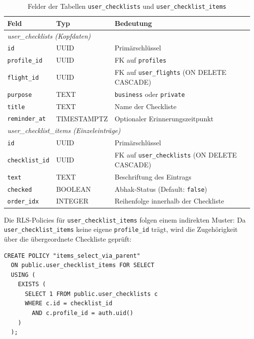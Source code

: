 \begin{table}[H]
  \centering
  \caption{Felder der Tabellen \texttt{user\_checklists} und
           \texttt{user\_checklist\_items}}
  \label{tab:checklists_felder}
  \begin{tabularx}{\textwidth}{l l X}
    \toprule
    \textbf{Feld} & \textbf{Typ} & \textbf{Bedeutung} \\
    \midrule
    \multicolumn{3}{l}{\textit{user\_checklists (Kopfdaten)}} \\
    \midrule
    \texttt{id}          & UUID        & Primärschlüssel \\
    \texttt{profile\_id} & UUID        & FK auf \texttt{profiles} \\
    \texttt{flight\_id}  & UUID        & FK auf \texttt{user\_flights} (ON DELETE CASCADE) \\
    \texttt{purpose}     & TEXT        & \texttt{business} oder \texttt{private} \\
    \texttt{title}       & TEXT        & Name der Checkliste \\
    \texttt{reminder\_at}& TIMESTAMPTZ & Optionaler Erinnerungszeitpunkt \\
    \midrule
    \multicolumn{3}{l}{\textit{user\_checklist\_items (Einzeleinträge)}} \\
    \midrule
    \texttt{id}           & UUID    & Primärschlüssel \\
    \texttt{checklist\_id}& UUID    & FK auf \texttt{user\_checklists} (ON DELETE CASCADE) \\
    \texttt{text}         & TEXT    & Beschriftung des Eintrags \\
    \texttt{checked}      & BOOLEAN & Abhak-Status (Default: \texttt{false}) \\
    \texttt{order\_idx}   & INTEGER & Reihenfolge innerhalb der Checkliste \\
    \bottomrule
  \end{tabularx}
\end{table}

Die RLS-Policies für \texttt{user\_checklist\_items} folgen einem indirekten
Muster: Da \texttt{user\_checklist\_items} keine eigene \texttt{profile\_id}
trägt, wird die Zugehörigkeit über die übergeordnete Checkliste geprüft:

\begin{lstlisting}[style=skyline-sql,
  caption={Indirekte RLS-Policy für \texttt{user\_checklist\_items}
           (complete\_working\_schema.sql)},
  label={lst:items_rls}]
CREATE POLICY "items_select_via_parent"
  ON public.user_checklist_items FOR SELECT
  USING (
    EXISTS (
      SELECT 1 FROM public.user_checklists c
      WHERE c.id = checklist_id
        AND c.profile_id = auth.uid()
    )
  );
\end{lstlisting}

